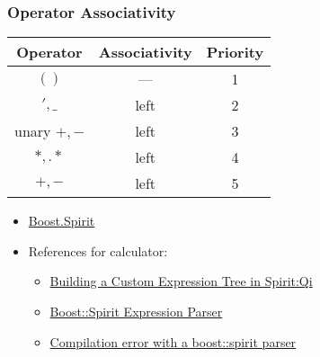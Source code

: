 \begin{frame}[fragile]
\frametitle{Operator Associativity}
%
\begin{center}
\begin{tabular}{|c|c|c|}
\hline
Operator & Associativity & Priority \\ \hline
$( )$    &      ---      &    1  \\ \hline
$',\_$    &      left     &    2  \\ \hline
unary $+,-$ &   left     &    3  \\ \hline
$*,.*$    &     left     &    4  \\ \hline
$+,-$     &     left     &    5  \\ \hline
\end{tabular}
\end{center}
%
\begin{itemize}
\item \hyperref[http://www.boost.org/doc/libs/1_57_0/libs/spirit/doc/html/index.html]{Boost.Spirit}
\item References for calculator:
    \begin{itemize}
    \item \hyperref[http://stackoverflow.com/questions/13056893/building-a-custom-expression-tree-in-spiritqi-without-utree-or-boostvariant/13060402]{Building a Custom Expression Tree in Spirit:Qi}
    \item \hyperref[http://stackoverflow.com/questions/8464969/boostspirit-expression-parser/8468822]{Boost::Spirit Expression Parser}
    \item \hyperref[http://stackoverflow.com/questions/9453712/compilation-error-with-a-boostspirit-parser/9458029]{Compilation error with a boost::spirit parser}
    \end{itemize}
\end{itemize}
%
\end{frame}


